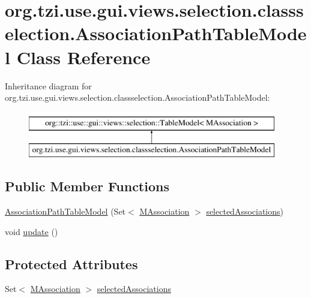 \hypertarget{classorg_1_1tzi_1_1use_1_1gui_1_1views_1_1selection_1_1classselection_1_1_association_path_table_model}{\section{org.\-tzi.\-use.\-gui.\-views.\-selection.\-classselection.\-Association\-Path\-Table\-Model Class Reference}
\label{classorg_1_1tzi_1_1use_1_1gui_1_1views_1_1selection_1_1classselection_1_1_association_path_table_model}
}
Inheritance diagram for org.\-tzi.\-use.\-gui.\-views.\-selection.\-classselection.\-Association\-Path\-Table\-Model\-:\begin{figure}[H]
\begin{center}
\leavevmode
\includegraphics[height=2.000000cm]{classorg_1_1tzi_1_1use_1_1gui_1_1views_1_1selection_1_1classselection_1_1_association_path_table_model}
\end{center}
\end{figure}
\subsection*{Public Member Functions}
\begin{DoxyCompactItemize}
\item 
\hyperlink{classorg_1_1tzi_1_1use_1_1gui_1_1views_1_1selection_1_1classselection_1_1_association_path_table_model_a36cf40e58860418df6e005ce07b51b32}{Association\-Path\-Table\-Model} (Set$<$ \hyperlink{interfaceorg_1_1tzi_1_1use_1_1uml_1_1mm_1_1_m_association}{M\-Association} $>$ \hyperlink{classorg_1_1tzi_1_1use_1_1gui_1_1views_1_1selection_1_1classselection_1_1_association_path_table_model_aee306f646a28db90a54355b9e1a99362}{selected\-Associations})
\item 
void \hyperlink{classorg_1_1tzi_1_1use_1_1gui_1_1views_1_1selection_1_1classselection_1_1_association_path_table_model_a26a6c146861799baa041b33edb09bf15}{update} ()
\end{DoxyCompactItemize}
\subsection*{Protected Attributes}
\begin{DoxyCompactItemize}
\item 
Set$<$ \hyperlink{interfaceorg_1_1tzi_1_1use_1_1uml_1_1mm_1_1_m_association}{M\-Association} $>$ \hyperlink{classorg_1_1tzi_1_1use_1_1gui_1_1views_1_1selection_1_1classselection_1_1_association_path_table_model_aee306f646a28db90a54355b9e1a99362}{selected\-Associations}
\end{DoxyCompactItemize}


